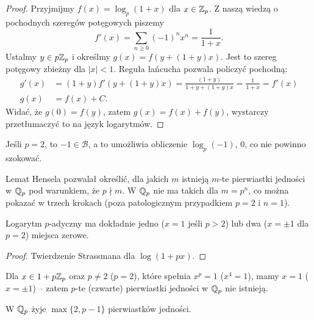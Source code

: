 \begin{proof}
	Przyjmijmy $f(x) = \log_p(1+x)$ dla $x \in \mathbb Z_p$.
	Z naszą wiedzą o pochodnych szeregów potęgowych piszemy
	\[
		f'(x) = \sum_{n \ge 0} (-1)^nx^n = \frac{1}{1+x}.
	\]
	Ustalmy $y \in p\mathbb Z_p$ i określmy $g(x) = f(y + (1+y)x)$.
	Jest to szereg potęgowy zbieżny dla $|x| < 1$.
	Reguła łańcucha pozwala policzyć pochodną:
	\begin{align*}
		g'(x) & = (1+y) f'(y + (1+y)x) = \frac{(1+y)}{1+y + (1+y)x}  = \frac{1}{1+x} = f'(x) \\
		g(x)& = f(x) + C.
	\end{align*}
	Widać, że $g(0) = f(y)$, zatem $g(x) = f(x) + f(y)$, wystarczy przetłumaczyć to na język logarytmów.
\end{proof}

Jeśli $p = 2$, to $-1 \in \mathcal B$, a to umożliwia obliczenie $\log_p(-1)$, $0$, co nie powinno szokować.

Lemat Hensela pozwalał określić, dla jakich $m$ istnieją $m$-te pierwiastki jedności w $\mathbb Q_p$ pod warunkiem, że $p \nmid m$.
W $\mathbb Q_p$ nie ma takich dla $m = p^n$, co można pokazać w trzech krokach (poza patologicznym przypadkiem $p = 2$ i $n = 1$).

\begin{fakt}
	Logarytm $p$-adyczny ma dokładnie jedno ($x = 1$ jeśli $p > 2$) lub dwa ($x = \pm 1$ dla $p = 2$) miejsca zerowe.
\end{fakt}

\begin{proof}
	Twierdzenie Strassmana dla $\log(1+px)$.
\end{proof}

\begin{wniosek}
	Dla $x \in 1 + p\mathbb Z_p$ oraz $p \neq 2$ ($p = 2$), które spełnia $x^p = 1$ ($x^4 = 1$), mamy $x = 1$ ($x = \pm 1$) -- zatem $p$-te (czwarte) pierwiastki jedności w $\mathbb Q_p$ nie istnieją.
\end{wniosek}

\begin{wniosek}
	W $\mathbb Q_p$ żyje $\max\{2, p - 1\}$ pierwiastków jedności.
\end{wniosek}